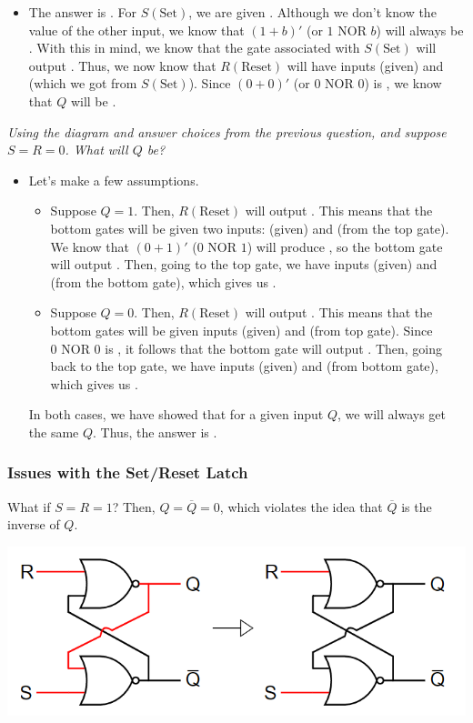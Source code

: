 \documentclass[letterpaper]{article}
\begin{document}
\begin{itemize}
    \item The answer is . For $S(\text{Set})$, we are given . Although we don't know the value of the other input, we know that $(1 + b)'$ (or $1 \text{ NOR } b$) will always be . With this in mind, we know that the gate associated with $S(\text{Set})$ will output . Thus, we now know that $R(\text{Reset})$ will have inputs  (given) and  (which we got from $S(\text{Set})$). Since $(0 + 0)'$ (or $0 \text{ NOR 0}$) is , we know that $Q$ will be . 
\end{itemize}

\bigskip 
\bigskip 

\emph{Using the diagram and answer choices from the previous question, and suppose $S = R = 0$. What will $Q$ be?}

\begin{itemize}
    \item Let's make a few assumptions.
    \begin{itemize}
        \item Suppose $Q = 1$. Then, $R(\text{Reset})$ will output . This means that the bottom gates will be given two inputs:  (given) and  (from the top gate). We know that $(0 + 1)'$ ($0 \text{ NOR } 1$) will produce , so the bottom gate will output . Then, going to the top gate, we have inputs  (given) and  (from the bottom gate), which gives us . 
        \item Suppose $Q = 0$. Then, $R(\text{Reset})$ will output . This means that the bottom gates will be given inputs  (given) and  (from top gate). Since $0 \text{ NOR } 0$ is , it follows that the bottom gate will output . Then, going back to the top gate, we have inputs  (given) and  (from bottom gate), which gives us . 
    \end{itemize}
    In both cases, we have showed that for a given input $Q$, we will always get the same $Q$. Thus, the answer is . 
\end{itemize}

\subsubsection{Issues with the Set/Reset Latch}
What if $S = R = 1$? Then, $Q = \overline{Q} = 0$, which violates the idea that $\overline{Q}$ is the inverse of $Q$.
\begin{center}
    \includegraphics[scale=0.5]{sr_bad_1.PNG}
\end{center}
\end{document}
